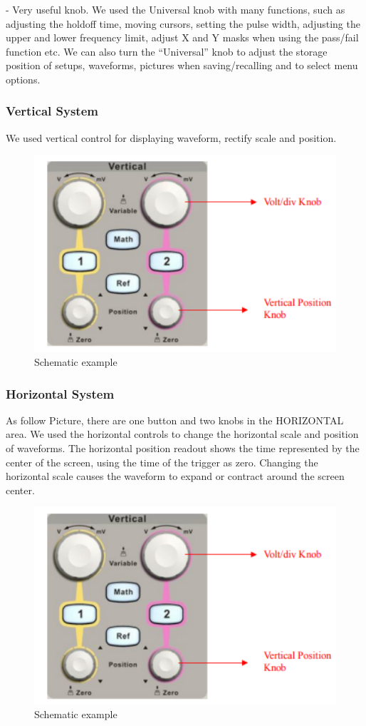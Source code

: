 - Very useful knob. We used the Universal knob with many functions, such as adjusting the
  holdoff time, moving cursors, setting the pulse width, adjusting the upper and lower frequency limit, adjust X and Y masks when
  using the pass/fail function etc. We can also turn the “Universal” knob to
  adjust the storage position of setups, waveforms, pictures when
  saving/recalling and to select menu options.
\subsubsection*{Vertical System}
We used vertical control for displaying waveform, rectify scale and
position.

\begin{figure}[H]
	\centering
	\includegraphics[width=12cm]{images/18.png}
	\caption{Schematic example}
	\label{fig:wow8}
\end{figure}


\subsubsection*{Horizontal System}
As follow Picture, there are one button and two knobs in the HORIZONTAL area.
We used the horizontal controls to change the horizontal scale and position of
waveforms. The horizontal position readout shows the time represented by the
center of the screen, using the time of the trigger as zero. Changing the horizontal
scale causes the waveform to expand or contract around the screen center.

\begin{figure}[H]
	\centering
	\includegraphics[width=12cm]{images/18.png}
	\caption{Schematic example}
	\label{fig:wow9}
\end{figure}


